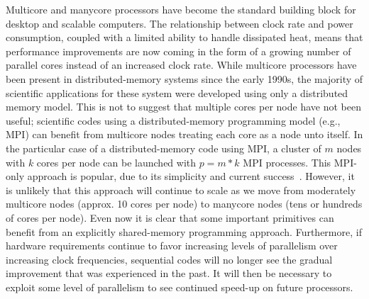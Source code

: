 \documentclass[10pt,conference,letterpaper]{IEEEtran}
\begin{document}
Multicore and manycore processors have become the standard building block for desktop and scalable computers. The relationship between clock rate and power consumption, coupled with a limited ability to handle dissipated heat, means that performance improvements are now coming in the form of a growing number of parallel cores instead of an increased clock rate. While multicore processors have been present in distributed-memory systems since the early 1990s, the majority of scientific applications for these system were developed using only a distributed memory model. This is not to suggest that multiple cores per node have not been useful; scientific codes using a distributed-memory programming model (e.g., MPI) can benefit from multicore nodes treating each core as a node unto itself. In the particular case of a distributed-memory code using MPI, a cluster of $m$ nodes with $k$ cores per node can be launched with $p=m*k$ MPI processes. This MPI-only approach is popular, due to its simplicity and current success~\cite{HerouxThoughts}. However, it is unlikely that this approach will continue to scale as we move from moderately multicore nodes (approx. 10 cores per node) to manycore nodes (tens or hundreds of cores per node). Even now it is clear that some important primitives can benefit from an explicitly shared-memory programming approach. Furthermore, if hardware requirements continue to favor increasing levels of parallelism over increasing clock frequencies, sequential codes will no longer see the gradual improvement that was experienced in the past. It will then be necessary to exploit some level of parallelism to see continued speed-up on future processors. 
\end{document}

